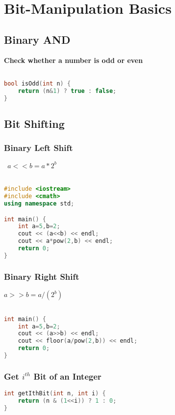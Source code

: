 \newpage
\chapter{Bit-Manipulation Basics}

\section{\textbf{Binary AND}}
\textbf{Check whether a number is odd or even}
\begin{lstlisting}[language=c++]

bool isOdd(int n) {
    return (n&1) ? true : false;
}

\end{lstlisting}

\section{\textbf{Bit Shifting}}

\subsection{Binary Left Shift}
\tab \texttt{ $a << b = a*2^b$}

\begin{lstlisting}[language=c++]

#include <iostream>
#include <cmath>
using namespace std;

int main() {
    int a=5,b=2;
    cout << (a<<b) << endl;
    cout << a*pow(2,b) << endl;  
    return 0;
}

\end{lstlisting}


\subsection{Binary Right Shift}
\tab \texttt{$ a >> b = a/(2^b)$}

\begin{lstlisting}[language=c++]

int main() {
    int a=5,b=2;
    cout << (a>>b) << endl;
    cout << floor(a/pow(2,b)) << endl;  
    return 0;
}

\end{lstlisting}

\subsection{Get $i^{th}$ Bit of an Integer}
\begin{lstlisting}[language=c++]
int getIthBit(int n, int i) {
    return (n & (1<<i)) ? 1 : 0;
}
\end{lstlisting}

